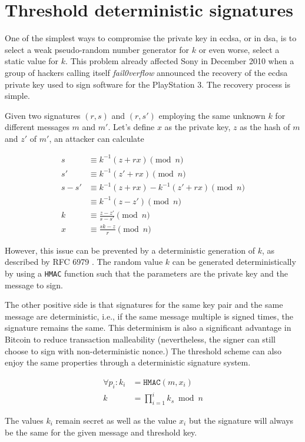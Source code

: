 \section{Threshold deterministic signatures}

One of the simplest ways to compromise the private key in \gls{ecdsa}, or in
\gls{dsa}, is to select a weak pseudo-random number generator for $k$ or even
worse, select a static value for $k$. This problem already affected Sony in
December 2010 when a group of hackers calling itself \textit{fail0verflow}
announced the recovery of the \gls{ecdsa} private key used to sign software for
the PlayStation 3. The recovery process is simple.

Given two signatures $(r, s)$ and $(r, s')$ employing the same unknown $k$ for
different messages $m$ and $m'$. Let's define $x$ as the private key, $z$ as the
hash of $m$ and $z'$ of $m'$, an attacker can calculate

\begin{equation}
\begin{split}
  s &\equiv k^{-1} (z + rx) \pmod n \\
  s' &\equiv k^{-1} (z' + rx) \pmod n \\
  s - s' &\equiv k^{-1} (z + rx) - k^{-1} (z' + rx) \pmod n \\
         &\equiv k^{-1} (z - z') \pmod n \\
  k &\equiv \frac{z - z'}{s - s'} \pmod n \\
  x &\equiv \frac{sk - z}{r} \pmod n
\end{split}
\end{equation}

However, this issue can be prevented by a deterministic generation of $k$, as
described by RFC 6979 \cite{rfc6979}. The random value $k$ can be generated
deterministically by using a \texttt{HMAC} function such that the parameters are
the private key and the message to sign.

The other positive side is that signatures for the same key pair and the same
message are deterministic, i.e., if the same message multiple is signed times, the
signature remains the same. This determinism is also a significant advantage in
Bitcoin to reduce transaction malleability (nevertheless, the signer can still
choose to sign with non-deterministic nonce.) The threshold scheme can also
enjoy the same properties through a deterministic signature system.

\begin{equation}
\begin{split}
  \forall p_i : k_i &= \texttt{HMAC}(m, x_i) \\
  k &= \prod_{i=1}^{i} k_s \bmod n
\end{split}
\end{equation}

The values $k_i$ remain secret as well as the value $x_i$
but the signature will always be the same for the given message and threshold
key.
